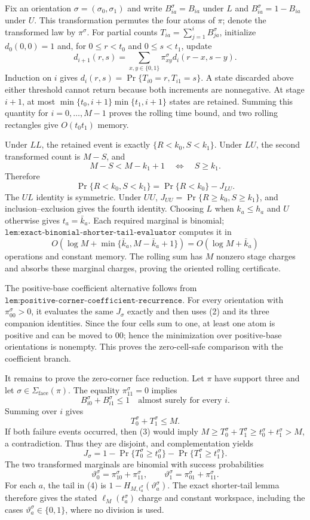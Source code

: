 Fix an orientation \(\sigma=(\sigma_0,\sigma_1)\) and write \(B_{ia}^{\sigma}=B_{ia}\) under \(L\) and \(B_{ia}^{\sigma}=1-B_{ia}\) under \(U\). This transformation permutes the four atoms of \(\pi\); denote the transformed law by \(\pi^\sigma\). For partial counts \(T_{ia}=\sum_{j=1}^iB_{ja}^{\sigma}\), initialize \(d_0(0,0)=1\) and, for \(0\le r<t_0\) and \(0\le s<t_1\), update
\[
d_{i+1}(r,s)=\sum_{x,y\in\{0,1\}}\pi^\sigma_{xy}d_i(r-x,s-y).
\tag{1}
\]
Induction on \(i\) gives \(d_i(r,s)=\Pr\{T_{i0}=r,T_{i1}=s\}\). A state discarded above either threshold cannot return because both increments are nonnegative. At stage \(i+1\), at most
\(\min\{t_0,i+1\}\min\{t_1,i+1\}\) states are retained. Summing this quantity for \(i=0,\ldots,M-1\) proves the rolling time bound, and two rolling rectangles give \(O(t_0t_1)\) memory.

Under \(LL\), the retained event is exactly \(\{R<k_0,S<k_1\}\). Under \(LU\), the second transformed count is \(M-S\), and
\[
M-S<M-k_1+1\quad\Longleftrightarrow\quad S\ge k_1.
\]
Therefore
\[
\Pr\{R<k_0,S<k_1\}=\Pr\{R<k_0\}-J_{LU}.
\tag{2}
\]
The \(UL\) identity is symmetric. Under \(UU\), \(J_{UU}=\Pr\{R\ge k_0,S\ge k_1\}\), and inclusion--exclusion gives the fourth identity. Choosing \(L\) when \(k_a\le h_a\) and \(U\) otherwise gives \(t_a=\bar k_a\). Each required marginal is binomial; \(\texttt{lem:exact-binomial-shorter-tail-evaluator}\) computes it in
\[
O\!\left(\log M+\min\{\bar k_a,M-\bar k_a+1\}\right)=O(\log M+\bar k_a)
\]
operations and constant memory. The rolling sum has \(M\) nonzero stage charges and absorbs these marginal charges, proving the oriented rolling certificate.

The positive-base coefficient alternative follows from
\(\texttt{lem:positive-corner-coefficient-recurrence}\). For every orientation with \(\pi^\sigma_{00}>0\), it evaluates the same \(J_\sigma\) exactly and then uses (2) and its three companion identities. Since the four cells sum to one, at least one atom is positive and can be moved to \(00\); hence the minimization over positive-base orientations is nonempty. This proves the zero-cell-safe comparison with the coefficient branch.

It remains to prove the zero-corner face reduction. Let \(\pi\) have support three and let \(\sigma\in\Sigma_{\mathrm{face}}(\pi)\). The equality \(\pi^\sigma_{11}=0\) implies
\[
B_{i0}^{\sigma}+B_{i1}^{\sigma}\le1
\quad\text{almost surely for every }i.
\]
Summing over \(i\) gives
\[
T_0^\sigma+T_1^\sigma\le M.
\tag{3}
\]
If both failure events occurred, then (3) would imply
\(M\ge T_0^\sigma+T_1^\sigma\ge t_0^\sigma+t_1^\sigma>M\), a contradiction. Thus they are disjoint, and complementation yields
\[
J_\sigma
=1-\Pr\{T_0^\sigma\ge t_0^\sigma\}
 -\Pr\{T_1^\sigma\ge t_1^\sigma\}.
\tag{4}
\]
The two transformed marginals are binomial with success probabilities
\[
\vartheta_0^\sigma=\pi^\sigma_{10}+\pi^\sigma_{11},
\qquad
\vartheta_1^\sigma=\pi^\sigma_{01}+\pi^\sigma_{11}.
\]
For each \(a\), the tail in (4) is
\(1-H_{M,t_a^\sigma}(\vartheta_a^\sigma)\).
The exact shorter-tail lemma therefore gives the stated \(\ell_M(t_a^\sigma)\) charge and constant workspace, including the cases \(\vartheta_a^\sigma\in\{0,1\}\), where no division is used.

